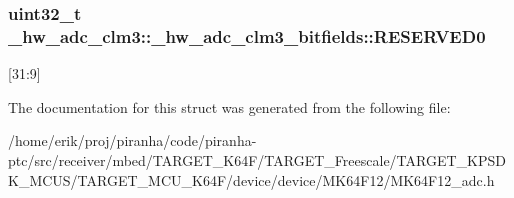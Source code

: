 \subsubsection[{\texorpdfstring{R\+E\+S\+E\+R\+V\+E\+D0}{RESERVED0}}]{\setlength{\rightskip}{0pt plus 5cm}uint32\+\_\+t \+\_\+hw\+\_\+adc\+\_\+clm3\+::\+\_\+hw\+\_\+adc\+\_\+clm3\+\_\+bitfields\+::\+R\+E\+S\+E\+R\+V\+E\+D0}\hypertarget{struct__hw__adc__clm3_1_1__hw__adc__clm3__bitfields_ad70851f4884941c6ad15474aff166dd5}{}\label{struct__hw__adc__clm3_1_1__hw__adc__clm3__bitfields_ad70851f4884941c6ad15474aff166dd5}
\mbox{[}31\+:9\mbox{]} 

The documentation for this struct was generated from the following file\+:\begin{DoxyCompactItemize}
\item 
/home/erik/proj/piranha/code/piranha-\/ptc/src/receiver/mbed/\+T\+A\+R\+G\+E\+T\+\_\+\+K64\+F/\+T\+A\+R\+G\+E\+T\+\_\+\+Freescale/\+T\+A\+R\+G\+E\+T\+\_\+\+K\+P\+S\+D\+K\+\_\+\+M\+C\+U\+S/\+T\+A\+R\+G\+E\+T\+\_\+\+M\+C\+U\+\_\+\+K64\+F/device/device/\+M\+K64\+F12/M\+K64\+F12\+\_\+adc.\+h\end{DoxyCompactItemize}
